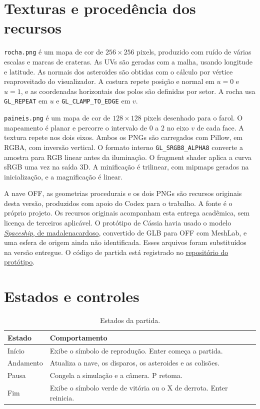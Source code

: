 \documentclass[12pt,a4paper]{article}
\begin{document}
\section{Texturas e procedência dos recursos}

\texttt{rocha.png} é um mapa de cor de $256\times256$ pixels, produzido com ruído de várias escalas e marcas de crateras. As UVs são geradas com a malha, usando longitude e latitude. As normais dos asteroides são obtidas com o cálculo por vértice reaproveitado do visualizador. A costura repete posição e normal em $u=0$ e $u=1$, e as coordenadas horizontais dos polos são definidas por setor. A rocha usa \texttt{GL\_REPEAT} em $u$ e \texttt{GL\_CLAMP\_TO\_EDGE} em $v$.

\texttt{paineis.png} é um mapa de cor de $128\times128$ pixels desenhado para o farol. O mapeamento é planar e percorre o intervalo de $0$ a $2$ no eixo $v$ de cada face. A textura repete nos dois eixos. Ambos os PNGs são carregados com Pillow, em RGBA, com inversão vertical. O formato interno \texttt{GL\_SRGB8\_ALPHA8} converte a amostra para RGB linear antes da iluminação. O fragment shader aplica a curva sRGB uma vez na saída 3D. A minificação é trilinear, com mipmaps gerados na inicialização, e a magnificação é linear.

A nave OFF, as geometrias procedurais e os dois PNGs são recursos originais desta versão, produzidos com apoio do Codex para o trabalho. A fonte é o próprio projeto. Os recursos originais acompanham esta entrega acadêmica, sem licença de terceiros aplicável. O protótipo de Cássia havia usado o modelo \href{https://sketchfab.com/3d-models/spaceship-1efc26312afe4d4c907ffcdba12f4a6a}{\emph{Spaceship}, de madalenacardoso}, convertido de GLB para OFF com MeshLab, e uma esfera de origem ainda não identificada. Esses arquivos foram substituídos na versão entregue. O código de partida está registrado no \href{https://github.com/cassia-santos/Atividade_5_CG/tree/26ae2dadadea36136a7d075f83f99ab339ec5f45/prototipo1}{repositório do protótipo}.

\section{Estados e controles}

\begin{table}[H]
\centering\small
\begin{tabularx}{\textwidth}{>{\raggedright\arraybackslash}p{3.2cm}X}
\toprule
Estado & Comportamento \\
\midrule
Início & Exibe o símbolo de reprodução. Enter começa a partida. \\
Andamento & Atualiza a nave, os disparos, os asteroides e as colisões. \\
Pausa & Congela a simulação e a câmera. P retoma. \\
Fim & Exibe o símbolo verde de vitória ou o X de derrota. Enter reinicia. \\
\bottomrule
\end{tabularx}
\caption{Estados da partida.}
\end{table}
\end{document}

